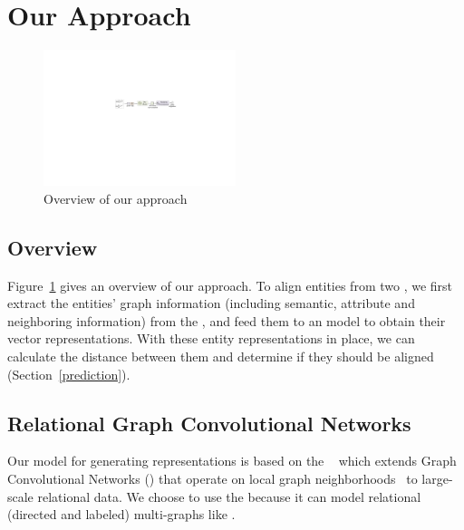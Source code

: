 \section{Our Approach}
	\label{section:app}
\begin{figure}[t!]
  \centering
  \includegraphics[width=0.5\textwidth]{figures/overview.pdf}
  \caption{Overview of our approach}\label{fig:overview}
\end{figure}
\subsection{Overview}
Figure~\ref{fig:overview} gives an overview of our approach. To align entities from two \KGs,
we first extract the entities' graph information (including semantic, attribute and neighboring information) from the \KGs,
and feed them to an \HRGCN model to obtain their vector representations.
With these entity
representations in place, we can calculate the distance between %
them and determine if they should be
aligned (Section~\ref{prediction}).




	
    \subsection{Relational Graph Convolutional Networks\label{sec:model}}
    Our model for generating \KG representations  is based on the \RGCN~\cite{Schlichtkrull2017Modeling} which extends Graph Convolutional Networks (\GCNs) that operate on local graph
neighborhoods~\cite{Duvenaud2015Convolutional,Kipf2016Semi} to large-scale relational data.
    We choose to use the \RGCN because it can model relational (directed and labeled) multi-graphs like \KGs.

